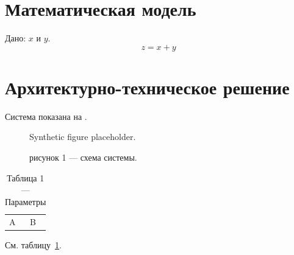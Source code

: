 \documentclass{gostcheck-vkr}
\begin{document}
\section{Математическая модель}
Дано: $x$ и $y$.
\begin{equation}
z = x + y
\end{equation}
\section{Архитектурно-техническое решение}
Система показана на .
\begin{figure}
\centering
Synthetic figure placeholder.
\caption{рисунок 1 — схема системы.}
\label{fig:demo}
\end{figure}
\begin{table}
\caption{Таблица 1 — Параметры}
\label{tab:demo}
\begin{tabular}{ll}
A & B \\
\end{tabular}
\end{table}
См. таблицу~\ref{tab:demo}.
\end{document}
